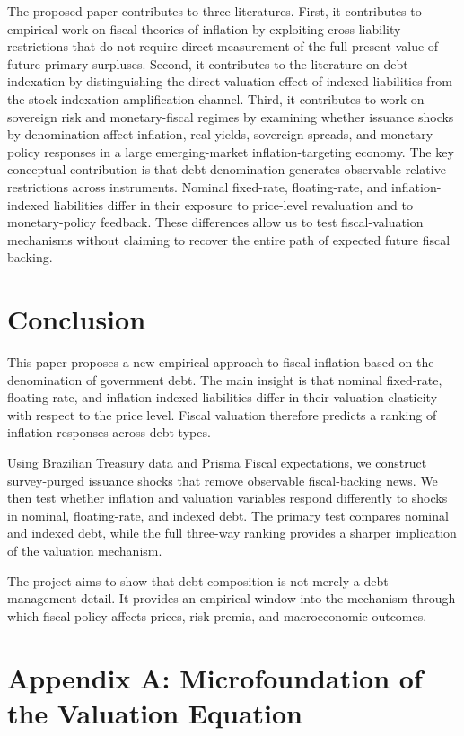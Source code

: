 \documentclass[12pt,a4paper]{article}
\begin{document}
The proposed paper contributes to three literatures. First, it contributes to empirical work on fiscal theories of inflation by exploiting cross-liability restrictions that do not require direct measurement of the full present value of future primary surpluses. Second, it contributes to the literature on debt indexation by distinguishing the direct valuation effect of indexed liabilities from the stock-indexation amplification channel. Third, it contributes to work on sovereign risk and monetary-fiscal regimes by examining whether issuance shocks by denomination affect inflation, real yields, sovereign spreads, and monetary-policy responses in a large emerging-market inflation-targeting economy. The key conceptual contribution is that debt denomination generates observable relative restrictions across instruments. Nominal fixed-rate, floating-rate, and inflation-indexed liabilities differ in their exposure to price-level revaluation and to monetary-policy feedback. These differences allow us to test fiscal-valuation mechanisms without claiming to recover the entire path of expected future fiscal backing.

\section{Conclusion}
\label{sec:conclusion}

This paper proposes a new empirical approach to fiscal inflation based on the denomination of government debt. The main insight is that nominal fixed-rate, floating-rate, and inflation-indexed liabilities differ in their valuation elasticity with respect to the price level. Fiscal valuation therefore predicts a ranking of inflation responses across debt types.

Using Brazilian Treasury data and Prisma Fiscal expectations, we construct survey-purged issuance shocks that remove observable fiscal-backing news. We then test whether inflation and valuation variables respond differently to shocks in nominal, floating-rate, and indexed debt. The primary test compares nominal and indexed debt, while the full three-way ranking provides a sharper implication of the valuation mechanism.

The project aims to show that debt composition is not merely a debt-management detail. It provides an empirical window into the mechanism through which fiscal policy affects prices, risk premia, and macroeconomic outcomes.

\appendix

\section{Appendix A: Microfoundation of the Valuation Equation}
\end{document}

